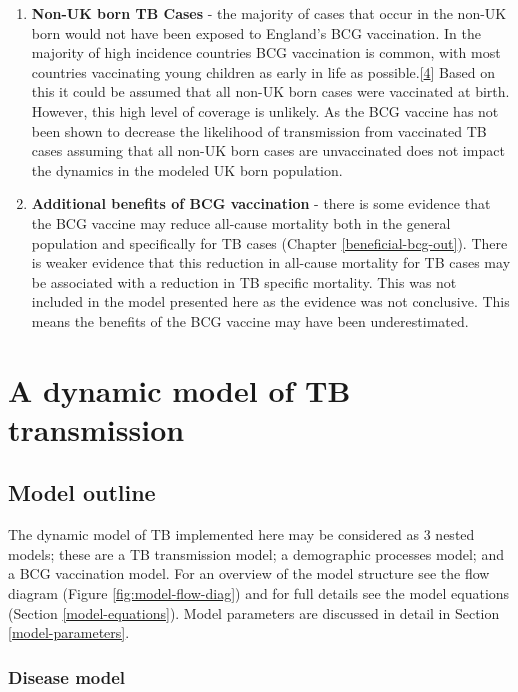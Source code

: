 \documentclass[11pt,twoside]{bristolthesis}
\begin{document}
\begin{enumerate}
  \item
    \textbf{Non-UK born TB Cases} - the majority of cases that occur in the non-UK born would not have been exposed to England's BCG vaccination. In the majority of high incidence countries BCG vaccination is common, with most countries vaccinating young children as early in life as possible.{[}\protect\hyperlink{ref-Zwerling2011a}{4}{]} Based on this it could be assumed that all non-UK born cases were vaccinated at birth. However, this high level of coverage is unlikely. As the BCG vaccine has not been shown to decrease the likelihood of transmission from vaccinated TB cases assuming that all non-UK born cases are unvaccinated does not impact the dynamics in the modeled UK born population.
  \item
    \textbf{Additional benefits of BCG vaccination} - there is some evidence that the BCG vaccine may reduce all-cause mortality both in the general population and specifically for TB cases (Chapter \ref{beneficial-bcg-out}). There is weaker evidence that this reduction in all-cause mortality for TB cases may be associated with a reduction in TB specific mortality. This was not included in the model presented here as the evidence was not conclusive. This means the benefits of the BCG vaccine may have been underestimated.
  \end{enumerate}
  \hypertarget{a-dynamic-model-of-tb-transmission}{%
  \section{A dynamic model of TB transmission}\label{a-dynamic-model-of-tb-transmission}}
  
  \hypertarget{model-outline}{%
  \subsection{Model outline}\label{model-outline}}
  
  The dynamic model of TB implemented here may be considered as 3 nested models; these are a TB transmission model; a demographic processes model; and a BCG vaccination model. For an overview of the model structure see the flow diagram (Figure \ref{fig:model-flow-diag}) and for full details see the model equations (Section \ref{model-equations}). Model parameters are discussed in detail in Section \ref{model-parameters}.
  
  \hypertarget{disease-model}{%
  \subsubsection{Disease model}\label{disease-model}}
  
\end{document}
